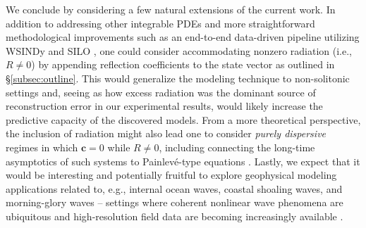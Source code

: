 \documentclass[journal=gmj]{CUP-JNL-DTM}%
\theoremstyle{definition}
\numberwithin{equation}{section}
\begin{document}
We conclude by considering a few natural extensions of the current work. In addition to addressing other integrable PDEs and more straightforward methodological improvements such as an end-to-end data-driven pipeline utilizing WSINDy \cite{Messenger.Bortz2021JournalofComputationalPhysics} and SILO \cite{Adriazola.etal2026SIAMJApplDynSyst}, one could consider accommodating nonzero radiation (i.e., $R \neq 0$) by appending reflection coefficients to the state vector as outlined in \S\ref{subsec:outline}. This would generalize the modeling technique to non-solitonic settings and, seeing as how excess radiation was the dominant source of reconstruction error in our experimental results, would likely increase the predictive capacity of the discovered models. From a more theoretical perspective, the inclusion of radiation might also lead one to consider \textit{purely dispersive} regimes in which $\mathbf{c} = 0$ while $R \neq 0$, including connecting the long-time asymptotics of such systems to Painlev\'e-type equations \cite{ablowitzSolitonsNonlinearEvolution1991}. Lastly, we expect that it would be interesting and potentially fruitful to explore geophysical modeling applications related to, e.g., internal ocean waves, coastal shoaling waves, and morning-glory waves -- settings where coherent nonlinear wave phenomena are ubiquitous and high-resolution field data are becoming increasingly available \cite{elDispersiveShockWaves2016, Lee.etal2024PLoSONE}.








\end{document}

